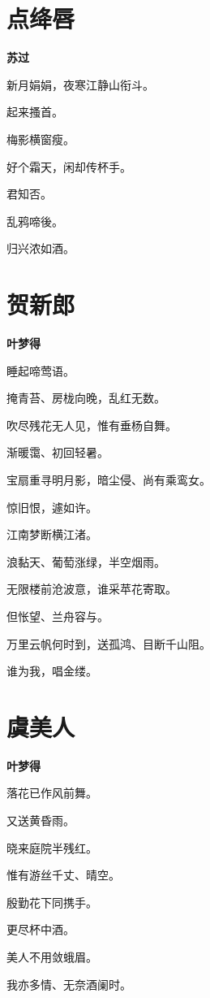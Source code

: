 \documentclass[12pt,a4paper]{ctexbook}
\begin{document}
\section{点绛唇}
\textbf{苏过}\par\vspace{0.5em}
新月娟娟，夜寒江静山衔斗。\par
起来搔首。\par
梅影横窗瘦。\par
好个霜天，闲却传杯手。\par
君知否。\par
乱鸦啼後。\par
归兴浓如酒。\par

\section{贺新郎}
\textbf{叶梦得}\par\vspace{0.5em}
睡起啼莺语。\par
掩青苔、房栊向晚，乱红无数。\par
吹尽残花无人见，惟有垂杨自舞。\par
渐暖霭、初回轻暑。\par
宝扇重寻明月影，暗尘侵、尚有乘鸾女。\par
惊旧恨，遽如许。\par
江南梦断横江渚。\par
浪黏天、葡萄涨绿，半空烟雨。\par
无限楼前沧波意，谁采苹花寄取。\par
但怅望、兰舟容与。\par
万里云帆何时到，送孤鸿、目断千山阻。\par
谁为我，唱金缕。\par

\section{虞美人}
\textbf{叶梦得}\par\vspace{0.5em}
落花已作风前舞。\par
又送黄昏雨。\par
晓来庭院半残红。\par
惟有游丝千丈、晴空。\par
殷勤花下同携手。\par
更尽杯中酒。\par
美人不用敛蛾眉。\par
我亦多情、无奈酒阑时。\par
\end{document}

